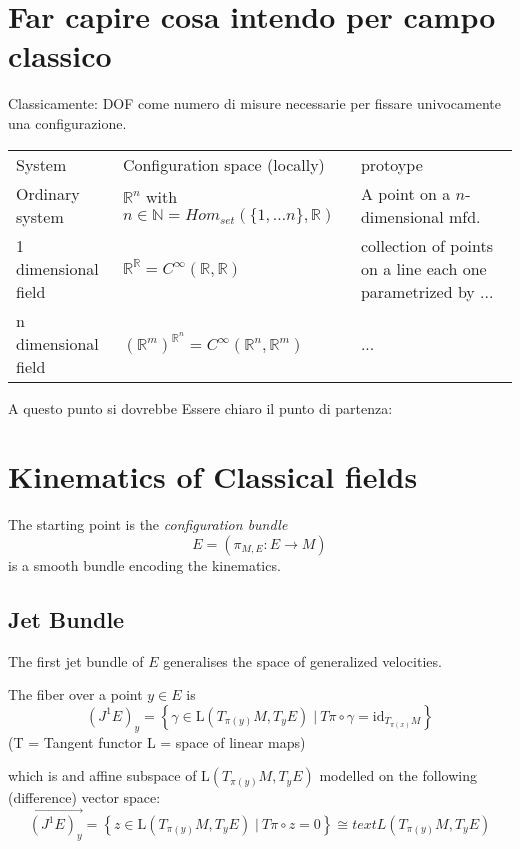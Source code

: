 \section{Far capire cosa intendo per campo classico}
Classicamente: DOF come numero di misure necessarie per fissare univocamente una configurazione.
\begin{table}[]
\begin{tabular}{lll}
	System & Configuration space (locally) & protoype 
 	\\
	Ordinary system & $\mathbb{R}^n$ with $n\in \mathbb{N} = Hom_{set}(\{1,\ldots n\}, \mathbb{R})$ & A point on a $n$-dimensional mfd.
	\\
	1 dimensional field & $\mathbb{R}^\mathbb{R} = C^\infty(\mathbb{R},\mathbb{R})$ & collection of points on a line each one parametrized by ...
	\\
	n dimensional field & $(\mathbb{R}^m)^{\mathbb{R}^n} = C^\infty (\mathbb{R}^n, \mathbb{R}^m)$ & ...
\end{tabular}
\end{table}

A questo punto si dovrebbe Essere chiaro il punto di partenza:
\\

\section{Kinematics of Classical fields}
The starting point is the \emph{configuration bundle} 
 	\begin{displaymath}
 		E = \left( \pi_{M,E} : E\rightarrow M \right)
 	\end{displaymath}
is a smooth bundle encoding the kinematics.

\subsection{Jet Bundle}
The first jet bundle of $E$ generalises the space of generalized velocities.

The fiber over a point $y\in E$ is
\begin{displaymath}
	\left( J^1 E\right)_y = \left\lbrace \gamma \in \text{L}(T_{\pi(y)}M, T_y E) \; \vert \: T\pi \circ \gamma = \text{id}_{T_{\pi(x)} M} \right\rbrace
\end{displaymath}
(T = Tangent functor L = space of linear maps)

which is and affine subspace of $\text{L}(T_{\pi(y)}M, T_y E)$ modelled on the following (difference) vector space:
\begin{displaymath}
	\vec{\left( J^1 E\right)_y} = \left\lbrace z \in \text{L}(T_{\pi(y)}M, T_y E) \; \vert \: T\pi \circ z = 0 \right\rbrace
	\cong text{L}(T_{\pi(y)}M, T_y E)
\end{displaymath}

